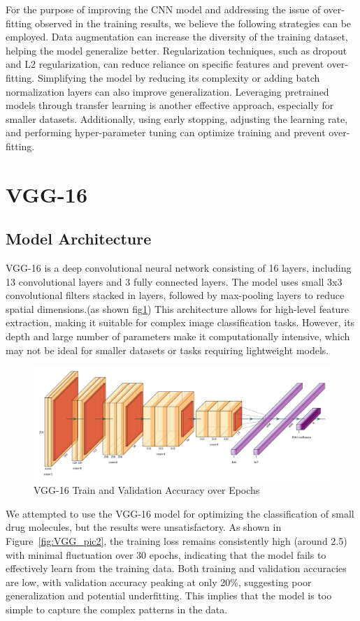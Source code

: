 \documentclass{mcmthesis}
\begin{document}
For the purpose of improving the CNN model and addressing the issue of over-fitting observed in the training results, we believe the following strategies can be employed. Data augmentation can increase the diversity of the training dataset, helping the model generalize better. Regularization techniques, such as dropout and L2 regularization, can reduce reliance on specific features and prevent over-fitting. Simplifying the model by reducing its complexity or adding batch normalization layers can also improve generalization. Leveraging pretrained models through transfer learning is another effective approach, especially for smaller datasets. Additionally, using early stopping, adjusting the learning rate, and performing hyper-parameter tuning can optimize training and prevent over-fitting. 
\section{VGG-16}

\subsection{Model Architecture}
VGG-16 is a deep convolutional neural network consisting of 16 layers, including 13 convolutional layers and 3 fully connected layers. The model uses small 3x3 convolutional filters stacked in layers, followed by max-pooling layers to reduce spatial dimensions.(as shown fig\ref{fig:VGG_pic1}) This architecture allows for high-level feature extraction, making it suitable for complex image classification tasks. However, its depth and large number of parameters make it computationally intensive, which may not be ideal for smaller datasets or tasks requiring lightweight models.

\begin{figure}[htbp]
    \centering
    \includegraphics[width=\textwidth]{pics/VGG16_pic1.png}
    \caption{VGG-16 Train and Validation Accuracy over Epochs}
    \label{fig:VGG_pic1}
\end{figure}
We attempted to use the VGG-16 model for optimizing the classification of small drug molecules, but the results were unsatisfactory. As shown in Figure~\ref{fig:VGG_pic2}, the training loss remains consistently high (around 2.5) with minimal fluctuation over 30 epochs, indicating that the model fails to effectively learn from the training data. Both training and validation accuracies are low, with validation accuracy peaking at only 20\%, suggesting poor generalization and potential underfitting. This implies that the model is too simple to capture the complex patterns in the data.
\end{document}
